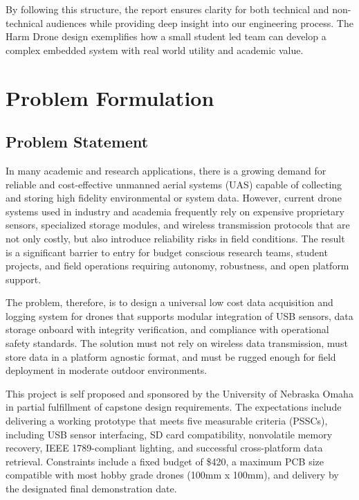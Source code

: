 \documentclass[12pt]{article}
\begin{document}
By following this structure, the report ensures clarity for both technical and non-technical audiences while providing deep insight into our engineering process. The Harm Drone design exemplifies how a small student led team can develop a complex embedded system with real world utility and academic value.



\section{Problem Formulation}
\subsection{Problem Statement}
\par In many academic and research applications, there is a growing demand for reliable and cost-effective unmanned aerial systems (UAS) capable of collecting and storing high fidelity environmental or system data. However, current drone systems used in industry and academia frequently rely on expensive proprietary sensors, specialized storage modules, and wireless transmission protocols that are not only costly, but also introduce reliability risks in field conditions. The result is a significant barrier to entry for budget conscious research teams, student projects, and field operations requiring autonomy, robustness, and open platform support.

\par The problem, therefore, is to design a universal low cost data acquisition and logging system for drones that supports modular integration of USB sensors, data storage onboard with integrity verification, and compliance with operational safety standards. The solution must not rely on wireless data transmission, must store data in a platform agnostic format, and must be rugged enough for field deployment in moderate outdoor environments.

\par This project is self proposed and sponsored by the University of Nebraska Omaha in partial fulfillment of capstone design requirements. The expectations include delivering a working prototype that meets five measurable criteria (PSSCs), including USB sensor interfacing, SD card compatibility, nonvolatile memory recovery, IEEE 1789-compliant lighting, and successful cross-platform data retrieval. Constraints include a fixed budget of \$420, a maximum PCB size compatible with most hobby grade drones (100mm x 100mm), and delivery by the designated final demonstration date.
\end{document}
